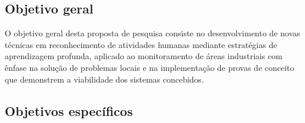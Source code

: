 % 
%

\subsection{Objetivo geral}
O objetivo geral desta proposta de pesquisa consiste no desenvolvimento de novas técnicas em reconhecimento de atividades humanas mediante estratégias de aprendizagem profunda, aplicado ao monitoramento de áreas industriais com ênfase na solução de problemas locais e na implementação de provas de conceito que demonstrem a viabilidade dos sistemas concebidos.

\subsection{Objetivos específicos} %
